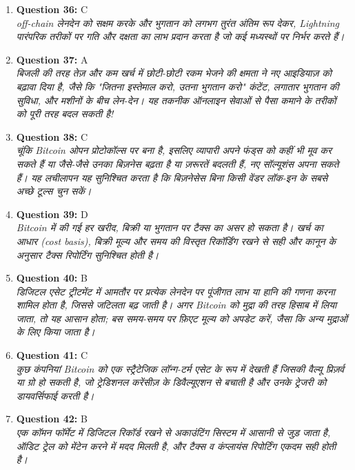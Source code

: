 \documentclass[12pt,a4paper]{article}
\begin{document}
\begin{enumerate}
\item \textbf{Question 36:} C
\\ \textit{off-chain लेनदेन को सक्षम करके और भुगतान को लगभग तुरंत अंतिम रूप देकर, Lightning पारंपरिक तरीकों पर गति और दक्षता का लाभ प्रदान करता है जो कई मध्यस्थों पर निर्भर करते हैं।}

\item \textbf{Question 37:} A
\\ \textit{बिजली की तरह तेज़ और कम खर्च में छोटी-छोटी रकम भेजने की क्षमता ने नए आइडियाज़ को बढ़ावा दिया है, जैसे कि "जितना इस्तेमाल करो, उतना भुगतान करो" कंटेंट, लगातार भुगतान की सुविधा, और मशीनों के बीच लेन-देन। यह तकनीक ऑनलाइन सेवाओं से पैसा कमाने के तरीकों को पूरी तरह बदल सकती है!}

\item \textbf{Question 38:} C
\\ \textit{चूंकि Bitcoin ओपन प्रोटोकॉल्स पर बना है, इसलिए व्यापारी अपने फंड्स को कहीं भी मूव कर सकते हैं या जैसे-जैसे उनका बिज़नेस बढ़ता है या ज़रूरतें बदलती हैं, नए सॉल्यूशंस अपना सकते हैं। यह लचीलापन यह सुनिश्चित करता है कि बिज़नेसेस बिना किसी वेंडर लॉक-इन के सबसे अच्छे टूल्स चुन सकें।}

\item \textbf{Question 39:} D
\\ \textit{Bitcoin में की गई हर खरीद, बिक्री या भुगतान पर टैक्स का असर हो सकता है। खर्च का आधार (cost basis), बिक्री मूल्य और समय की विस्तृत रिकॉर्डिंग रखने से सही और कानून के अनुसार टैक्स रिपोर्टिंग सुनिश्चित होती है।}

\item \textbf{Question 40:} B
\\ \textit{डिजिटल एसेट ट्रीटमेंट में आमतौर पर प्रत्येक लेनदेन पर पूंजीगत लाभ या हानि की गणना करना शामिल होता है, जिससे जटिलता बढ़ जाती है। अगर Bitcoin को मुद्रा की तरह हिसाब में लिया जाता, तो यह आसान होता; बस समय-समय पर फ़िएट मूल्य को अपडेट करें, जैसा कि अन्य मुद्राओं के लिए किया जाता है।}

\item \textbf{Question 41:} C
\\ \textit{कुछ कंपनियां Bitcoin को एक स्ट्रैटेजिक लॉन्ग-टर्म एसेट के रूप में देखती हैं जिसकी वैल्यू प्रिज़र्व या ग्रो हो सकती है, जो ट्रेडिशनल करेंसीज़ के डिवैल्यूएशन से बचाती है और उनके ट्रेजरी को डायवर्सिफाई करती है।}

\item \textbf{Question 42:} B
\\ \textit{एक कॉमन फॉर्मेट में डिजिटल रिकॉर्ड रखने से अकाउंटिंग सिस्टम में आसानी से जुड़ जाता है, ऑडिट ट्रेल को मेंटेन करने में मदद मिलती है, और टैक्स व कंप्लायंस रिपोर्टिंग एकदम सही होती है।}


\end{enumerate}
\end{document}
